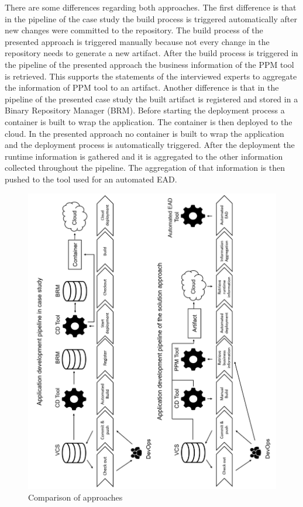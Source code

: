 There are some differences regarding both approaches. The first difference is that in the pipeline of the case study the build process is triggered automatically after new changes were committed to the repository. The build process of the presented approach is triggered manually because not every change in the repository needs to generate a new artifact. After the build process is triggered in the pipeline of the presented approach the business information of the PPM tool is retrieved. This supports the statements of the interviewed experts to aggregate the information of PPM tool to an artifact. Another difference is that in the pipeline of the presented case study the built artifact is registered and stored in a Binary Repository Manager (BRM). Before starting the deployment process a container is built to wrap the application. The container is then deployed to the cloud. In the presented approach no container is built to wrap the application and the deployment process is automatically triggered. After the deployment the runtime information is gathered and it is aggregated to the other information collected throughout the pipeline. The aggregation of that information is then pushed to the tool used for an automated EAD.

\begin{figure}[htpb]
  \centering
  \includegraphics[width=1.0\textwidth]{figures/evaluation/comparissonapproaches.png}
  \caption{ Comparison of approaches}
  \label{fig:comparison-approaches}
\end{figure}

